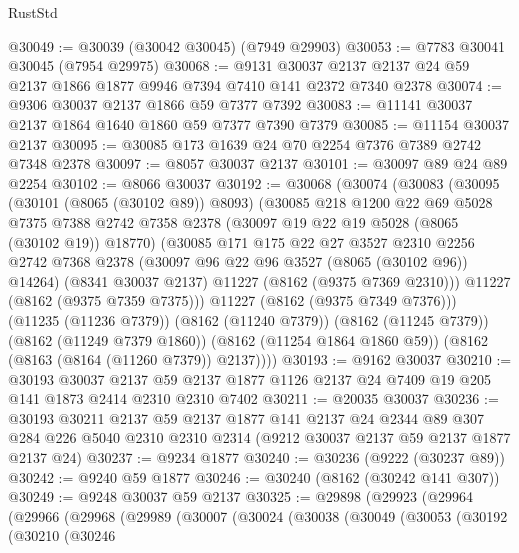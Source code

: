 \begin{lexlean}{RustStd}
\begin{coremodule}
@30049 := @30039 (@30042 @30045) (@7949 @29903)
@30053 := @7783 @30041 @30045 (@7954 @29975)
@30068 := @9131
    @30037
    @2137
    @2137
    @24
    @59
    @2137
    @1866
    @1877
    @9946
    @7394
    @7410
    @141
    @2372
    @7340
    @2378
@30074 := @9306 @30037 @2137 @1866 @59 @7377 @7392
@30083 := @11141 @30037 @2137 @1864 @1640 @1860 @59 @7377 @7390 @7379
@30085 := @11154 @30037 @2137
@30095 := @30085 @173 @1639 @24 @70 @2254 @7376 @7389 @2742 @7348 @2378
@30097 := @8057 @30037 @2137
@30101 := @30097 @89 @24 @89 @2254
@30102 := @8066 @30037
@30192 := @30068
    (@30074
      (@30083
        (@30095
          (@30101 (@8065 (@30102 @89)) @8093)
          (@30085
            @218
            @1200
            @22
            @69
            @5028
            @7375
            @7388
            @2742
            @7358
            @2378
            (@30097 @19 @22 @19 @5028 (@8065 (@30102 @19)) @18770)
            (@30085
              @171
              @175
              @22
              @27
              @3527
              @2310
              @2256
              @2742
              @7368
              @2378
              (@30097 @96 @22 @96 @3527 (@8065 (@30102 @96)) @14264)
              (@8341 @30037 @2137)
              @11227
              (@8162 (@9375 @7369 @2310)))
            @11227
            (@8162 (@9375 @7359 @7375)))
          @11227
          (@8162 (@9375 @7349 @7376)))
        (@11235 (@11236 @7379))
        (@8162 (@11240 @7379))
        (@8162 (@11245 @7379))
        (@8162 (@11249 @7379 @1860))
        (@8162 (@11254 @1864 @1860 @59))
        (@8162 (@8163 (@8164 (@11260 @7379)) @2137))))
@30193 := @9162 @30037
@30210 := @30193
    @30037
    @2137
    @59
    @2137
    @1877
    @1126
    @2137
    @24
    @7409
    @19
    @205
    @141
    @1873
    @2414
    @2310
    @2310
    @7402
@30211 := @20035 @30037
@30236 := @30193
    @30211
    @2137
    @59
    @2137
    @1877
    @141
    @2137
    @24
    @2344
    @89
    @307
    @284
    @226
    @5040
    @2310
    @2310
    @2314
    (@9212 @30037 @2137 @59 @2137 @1877 @2137 @24)
@30237 := @9234 @1877
@30240 := @30236 (@9222 (@30237 @89))
@30242 := @9240 @59 @1877
@30246 := @30240 (@8162 (@30242 @141 @307))
@30249 := @9248 @30037 @59 @2137
@30325 := @29898
    (@29923
      (@29964
        (@29966
          (@29968
            (@29989
              (@30007
                (@30024
                  (@30038
                    (@30049
                      (@30053
                        (@30192
                          (@30210
                            (@30246

\end{coremodule}
\end{lexlean}
